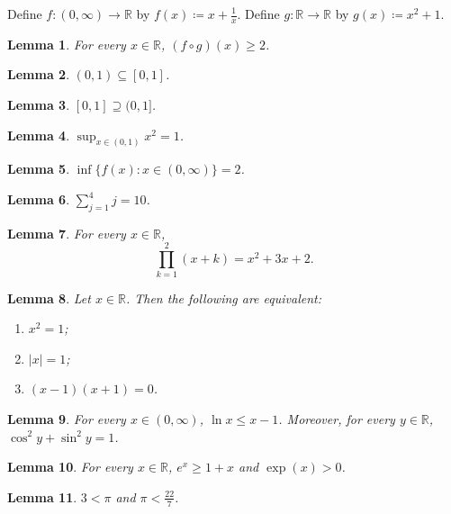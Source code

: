 \documentclass{article}
\newtheorem{lemma}{Lemma}
\begin{document}
Define $f\colon(0,\infty)\to\mathbb{R}$ by $f(x)\coloneqq x+\frac1x$.
Define $g\colon\mathbb{R}\to\mathbb{R}$ by $g(x)\coloneqq x^2+1$.

\begin{lemma}\label{lem:comp}
For every $x\in\mathbb{R}$, $(f\circ g)(x)\ge2$.
\end{lemma}

\begin{lemma}\label{lem:sub}
$(0,1)\subseteq[0,1]$.
\end{lemma}

\begin{lemma}\label{lem:sup}
$[0,1]\supseteq(0,1]$.
\end{lemma}

\begin{lemma}\label{lem:bounds}
$\sup_{x\in(0,1)} x^2=1$.
\end{lemma}

\begin{lemma}\label{lem:inf}
$\inf\{f(x) : x\in(0,\infty)\}=2$.
\end{lemma}

\begin{lemma}\label{lem:sums}
$\sum_{j=1}^{4} j=10$.
\end{lemma}

\begin{lemma}\label{lem:products}
For every $x\in\mathbb{R}$, $$\prod_{k=1}^{2}(x+k)=x^2+3x+2.$$
\end{lemma}

\begin{lemma}\label{lem:tfae}
Let $x\in\mathbb{R}$.
Then the following are equivalent:
\begin{enumerate}
\item $x^2=1$;
\item $\lvert x\rvert=1$;
\item[(c)] $(x-1)(x+1)=0$.
\end{enumerate}
\end{lemma}

\begin{lemma}\label{lem:functions}
For every $x\in(0,\infty)$, $\ln x\le x-1$.
Moreover, for every $y\in\mathbb{R}$, $\cos^2 y+\sin^2 y=1$.
\end{lemma}

\begin{lemma}\label{lem:exp}
For every $x\in\mathbb{R}$, $e^{x}\ge1+x$ and $\exp(x)>0$.
\end{lemma}

\begin{lemma}\label{lem:pi}
$3<\pi$ and $\pi<\frac{22}{7}$.
\end{lemma}
\end{document}
